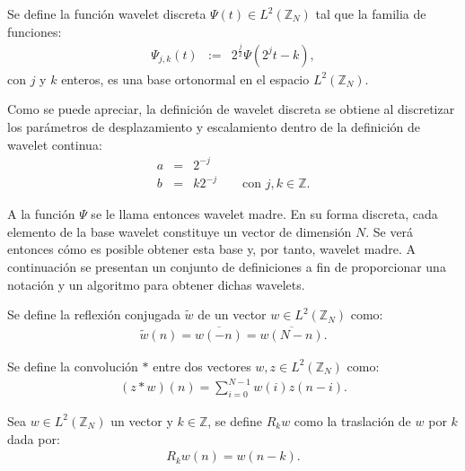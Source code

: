 \begin{definition}
Se define la funci\'on wavelet discreta $\Psi(t)\in L^2(\mathbb{Z}_N)$ tal que la familia de funciones:
\begin{eqnarray}
\Psi_{j,k}(t)&:=&2^{\frac{j}{2}}\Psi(2^jt-k),\nonumber
\end{eqnarray}
con $j$ y $k$ enteros, es una base ortonormal en el espacio $L^2(\mathbb{Z}_N)$.
\label{wav-discreta}
\end{definition}

\par Como se puede apreciar, la definici\'on de wavelet discreta se obtiene al discretizar los parámetros de desplazamiento y escalamiento dentro de la definici\'on de wavelet continua:
\begin{eqnarray}
a&=&2^{-j}\nonumber\\
b&=&k2^{-j}\qquad\mbox{con $j,k\in \mathbb{Z}$}.\nonumber
\end{eqnarray}

\par A la funci\'on $\Psi$ se le llama entonces wavelet madre. En su forma discreta, cada elemento de la base wavelet constituye un vector de dimensi\'on $N$. Se ver\'a entonces c\'omo es posible obtener esta base y, por tanto, wavelet madre. A continuaci\'on se presentan un conjunto de definiciones a fin de proporcionar una notaci\'on y un algoritmo para obtener dichas wavelets.\\

\begin{definition}
Se define la reflexi\'on conjugada $\tilde{w}$ de un vector $w\in L^2\left(\mathbb{Z}_N\right)$ como:
\begin{eqnarray}
\tilde{w}(n)=\overline{w(-n)}=\overline{w(N-n)}.\nonumber
\end{eqnarray}
\end{definition}

\begin{definition}
Se define la convoluci\'on $\ast$ entre dos vectores $w,z\in L^2(\mathbb{Z}_N)$ como:
\begin{eqnarray}
(z \ast w )(n) = \sum_{i=0}^{N-1}w(i)z(n-i).\nonumber
\end{eqnarray}
\end{definition}

\begin{definition}
Sea $w\in L^2(\mathbb{Z}_N)$ un vector y $k\in\mathbb{Z}$, se define $R_kw$ como la traslaci\'on de $w$ por $k$ dada por:
\begin{eqnarray}
R_kw(n)=w(n-k).\nonumber
\end{eqnarray}
\end{definition}

